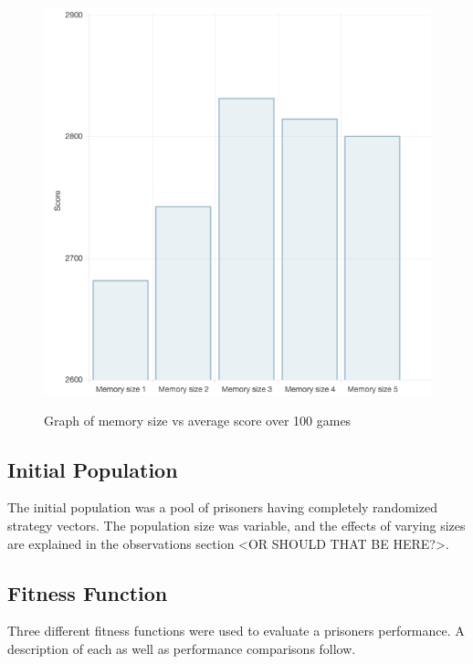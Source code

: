\documentclass[12pt]{article}
\begin{document}
\begin{figure}[h]
    \caption{Graph of memory size vs average score over 100 games}
    \centering
    \includegraphics[scale=0.6]{figures/memsize-vs-score.png}
    \label{fig1}
\end{figure}

\subsection{Initial Population}
The initial population was a pool of prisoners having completely randomized
strategy vectors.  The population size was variable, and the effects of varying
sizes are explained in the observations section <OR SHOULD THAT BE HERE?>.

\subsection{Fitness Function}

Three different fitness functions were used to evaluate a prisoners performance.
A description of each as well as performance comparisons follow.
\end{document}
